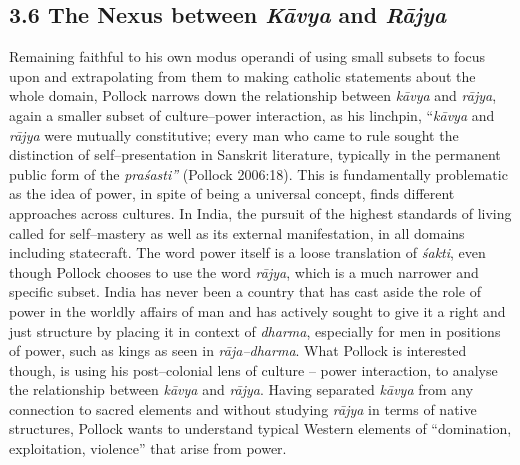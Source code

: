 \subsection*{3.6 The Nexus between \textit{Kāvya} and \textit{Rājya}}

Remaining faithful to his own modus operandi of using small subsets to focus upon and extrapolating from them to making catholic statements about the whole domain, Pollock narrows down the relationship between \textit{kāvya} and \textit{rājya}, again a smaller subset of culture–power interaction, as his linchpin, “\textit{kāvya} and \textit{rājya} were mutually constitutive; every man who came to rule sought the distinction of self–presentation in Sanskrit literature, typically in the permanent public form of the \textit{praśasti”} (Pollock 2006:18). This is fundamentally problematic as the idea of power, in spite of being a universal concept, finds different approaches across cultures. In India, the pursuit of the highest standards of living called for self–mastery as well as its external manifestation, in all domains including statecraft. The word power itself is a loose translation of \textit{śakti}, even though Pollock chooses to use the word \textit{rājya}, which is a much narrower and specific subset. India has never been a country that has cast aside the role of power in the worldly affairs of man and has actively sought to give it a right and just structure by placing it in context of \textit{dharma}, especially for men in positions of power, such as kings as seen in \textit{rāja–dharma}. What Pollock is interested though, is using his post–colonial lens of culture – power interaction, to analyse the relationship between \textit{kāvya} and \textit{rājya}. Having separated \textit{kāvya} from any connection to sacred elements and without studying \textit{rājya} in terms of native structures, Pollock wants to understand typical Western elements of “domination, exploitation, violence” that arise from power. 

